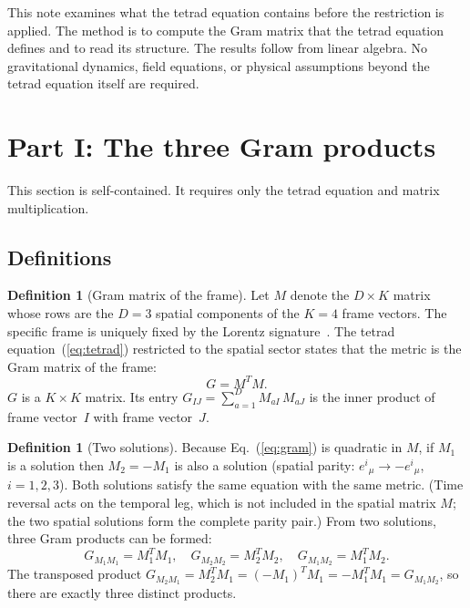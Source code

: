 \documentclass[twocolumn]{iopjournal}
\theoremstyle{definition}
\newtheorem{definition}[lemma]{Definition}
\begin{document}
This note examines what the tetrad equation contains before the
restriction is applied.  The method is to compute the Gram matrix that
the tetrad equation defines and to read its structure.  The results
follow from linear algebra.  No gravitational dynamics, field equations,
or physical assumptions beyond the tetrad equation itself are required.


\section*{Part I: The three Gram products}

This section is self-contained.  It requires only the tetrad equation
and matrix multiplication.


\subsection*{Definitions}

\begin{definition}[Gram matrix of the frame]
\label{def:gram}
Let $M$ denote the $D \times K$ matrix whose rows are the $D = 3$
spatial components of the $K = 4$ frame vectors.  The specific frame is
uniquely fixed by the Lorentz signature~\cite{Nelson2026a}.  The tetrad
equation~(\ref{eq:tetrad}) restricted to the spatial sector states
that the metric is the Gram matrix of the frame:
\begin{equation}
  G = M^T M.
  \label{eq:gram}
\end{equation}
$G$ is a $K \times K$ matrix.  Its entry
$G_{IJ} = \sum_{a=1}^{D} M_{aI}\,M_{aJ}$ is the inner product of frame
vector~$I$ with frame vector~$J$.
\end{definition}

\begin{definition}[Two solutions]
\label{def:roots}
Because Eq.~(\ref{eq:gram}) is quadratic in $M$, if $M_1$ is a
solution then $M_2 = -M_1$ is also a solution (spatial parity:
$e^i{}_\mu \to -e^i{}_\mu$, $i = 1,2,3$).  Both solutions satisfy the
same equation with the same metric.  (Time reversal acts on the temporal
leg, which is not included in the spatial matrix $M$; the two spatial
solutions form the complete parity pair.)  From two solutions, three
Gram products can be formed:
\begin{equation}
  G_{M_1 M_1} = M_1^T M_1, \quad
  G_{M_2 M_2} = M_2^T M_2, \quad
  G_{M_1 M_2} = M_1^T M_2.
  \label{eq:three_products}
\end{equation}
The transposed product $G_{M_2 M_1} = M_2^T M_1 = (-M_1)^T M_1
= -M_1^T M_1 = G_{M_1 M_2}$, so there are exactly three distinct
products.
\end{definition}
\end{document}

